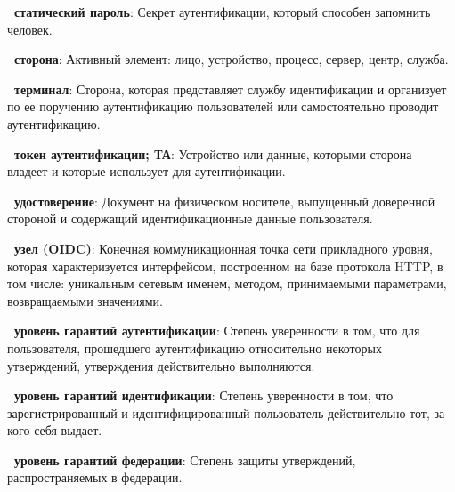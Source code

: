 
{\bf \thedefctr~статический пароль}:
Секрет аутентификации, который способен запомнить человек.

{\bf \thedefctr~сторона}:
Активный элемент: лицо, устройство, процесс, сервер, центр, служба.

{\bf \thedefctr~терминал}:
Сторона, которая представляет службу идентификации и организует по ее поручению
аутентификацию пользователей или самостоятельно проводит аутентификацию.

{\bf \thedefctr~токен аутентификации; ТА}:
Устройство или данные, которыми сторона владеет и которые использует для
аутентификации.

{\bf \thedefctr~удостоверение}:
Документ на физическом носителе, выпущенный доверенной стороной и содержащий
идентификационные данные пользователя.


{\bf \thedefctr~узел (OIDC)}:
Конечная коммуникационная точка сети прикладного уровня,
которая характеризуется интерфейсом, построенном на базе протокола HTTP,  
в том числе: уникальным сетевым именем, методом, принимаемыми параметрами,
возвращаемыми значениями.


{\bf \thedefctr~уровень гарантий аутентификации}:
Степень уверенности в том, что для пользователя, прошедшего аутентификацию
относительно некоторых утверждений, утверждения действительно выполняются.


{\bf \thedefctr~уровень гарантий идентификации}:
Степень уверенности в том, что зарегистрированный и идентифицированный
пользователь действительно тот, за кого себя выдает.


{\bf \thedefctr~уровень гарантий федерации}:
Степень защиты утверждений, распространяемых в федерации.


